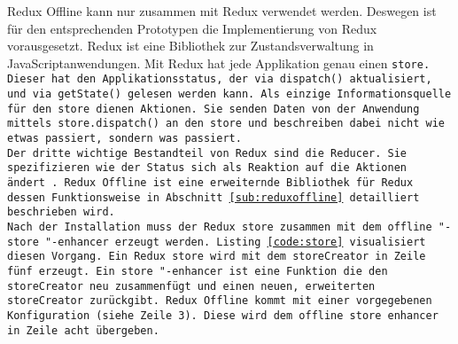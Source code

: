%
%
Redux Offline kann nur zusammen mit Redux verwendet werden. Deswegen ist für den entsprechenden Prototypen die Implementierung von Redux vorausgesetzt.
Redux ist eine Bibliothek zur Zustandsverwaltung in JavaScriptanwendungen.
Mit Redux hat jede Applikation genau einen \tt{store}. Dieser hat den Applikationsstatus, der via \tt{dispatch()} aktualisiert, und via \tt{getState()} gelesen werden kann.
Als einzige Informationsquelle für den \tt{store} dienen Aktionen. Sie senden Daten von der Anwendung mittels \tt{store.dispatch()} an den \tt{store} und beschreiben dabei nicht wie etwas passiert, sondern was passiert.\\
Der dritte wichtige Bestandteil von Redux sind die \tt{Reducer}. Sie spezifizieren wie der Status sich als Reaktion auf die Aktionen ändert~\cite{redux}.
% 
Redux Offline ist eine erweiternde Bibliothek für Redux dessen Funktionsweise in Abschnitt \ref{sub:reduxoffline} detailliert beschrieben wird.\\
Nach der Installation muss der Redux \tt{store} zusammen mit dem \tt{offline "-store "-enhancer} erzeugt werden. Listing \ref{code:store} visualisiert diesen Vorgang. Ein Redux \tt{store} wird mit dem \tt{storeCreator} in Zeile fünf erzeugt. Ein \tt{store "-enhancer} ist eine Funktion die den \tt{storeCreator} neu zusammenfügt und einen neuen, erweiterten \tt{storeCreator} zurückgibt.
Redux Offline kommt mit einer vorgegebenen Konfiguration (siehe Zeile 3). Diese wird dem \tt{offline store enhancer} in Zeile acht übergeben.
\begin{center}
  
\end{center}
